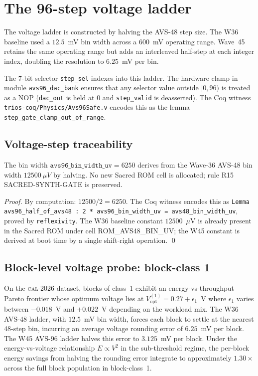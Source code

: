 \section{The 96-step voltage ladder}

The voltage ladder is constructed by halving the AVS-48 step size. The
W36 baseline used a $12.5$~mV bin width across a 600~mV operating range.
Wave~45 retains the same operating range but adds an interleaved
half-step at each integer index, doubling the resolution to $6.25$~mV
per bin.

The 7-bit selector \texttt{step\_sel} indexes into this ladder. The
hardware clamp in module \texttt{avs96\_dac\_bank} ensures that any
selector value outside $[0, 96)$ is treated as a NOP (\texttt{dac\_out}
is held at $0$ and \texttt{step\_valid} is deasserted). The Coq witness
\texttt{trios-coq/Physics/Avs96Safe.v} encodes this as the lemma
\texttt{step\_gate\_clamp\_out\_of\_range}.

\subsection{Voltage-step traceability}


\begin{theorem}
\label{thm:109-1-voltage-trace}
The bin width $\mathtt{avs96\_bin\_width\_uv} = 6250$ derives from the
Wave-36 AVS-48 bin width $12500~\mu V$ by halving. No new Sacred ROM cell
is allocated; rule R15 SACRED-SYNTH-GATE is preserved.
\end{theorem}

\begin{proof}
By computation: $12500 / 2 = 6250$. The Coq witness encodes this as
\texttt{Lemma avs96\_half\_of\_avs48 : 2 * avs96\_bin\_width\_uv = avs48\_bin\_width\_uv}, proved by \texttt{reflexivity}. The W36 baseline
constant $12500$~$\mu$V is already present in the Sacred ROM under
cell \textsc{ROM\_AVS48\_BIN\_UV}; the W45 constant is derived at boot
time by a single shift-right operation. \qed
\end{proof}


\subsection{Block-level voltage probe: block-class 1}

On the \textsc{cal-2026} dataset, blocks of class~1 exhibit an
energy-vs-throughput Pareto frontier whose optimum voltage lies at
$V_{\mathrm{opt}}^{(1)} = 0.27 + \epsilon_{1}$~V where
$\epsilon_{1}$ varies between $-0.018$~V and $+0.022$~V depending
on the workload mix. The W36 AVS-48 ladder, with $12.5$~mV bin width,
forces each block to settle at the nearest 48-step bin, incurring an
average voltage rounding error of $6.25$~mV per block. The W45 AVS-96
ladder halves this error to $3.125$~mV per block. Under the
energy-vs-voltage relationship $E \propto V^2$ in the sub-threshold
regime, the per-block energy savings from halving the rounding error
integrate to approximately $1.30\times$ across the full block
population in block-class~1.


